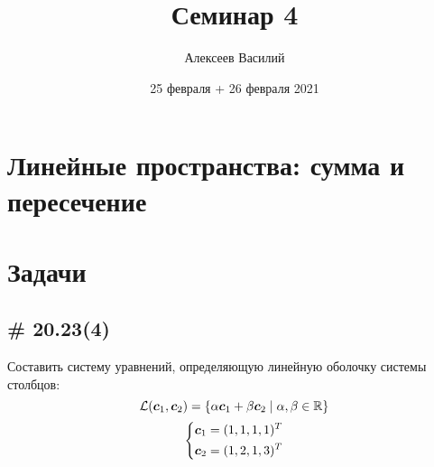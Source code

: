 \documentclass[a4paper,12pt]{article}
\author{Алексеев Василий}
\title{Семинар 4}
\date{25 февраля + 26 февраля 2021}
\begin{document}
  \maketitle
  
  \tableofcontents

  \thispagestyle{empty}
  
  \newpage
  


  \section{Линейные пространства: сумма и пересечение}
  
  \section{Задачи}
  
  
  \subsection{\# 20.23(4)}
  
  Составить систему уравнений, определяющую линейную оболочку системы столбцов:
  \[
    \mathcal L(\boldsymbol c_1, \boldsymbol c_2) = \{\alpha \boldsymbol c_1 + \beta \boldsymbol c_2 \mid \alpha, \beta \in \operatorname{\mathbb R}\}
  \]
  \[
    \left\{
      \begin{aligned}
        &\boldsymbol c_1 = (1, 1, 1, 1)^T\\
        &\boldsymbol c_2 = (1, 2, 1, 3)^T
      \end{aligned}
    \right.
  \]
  
\end{document}
